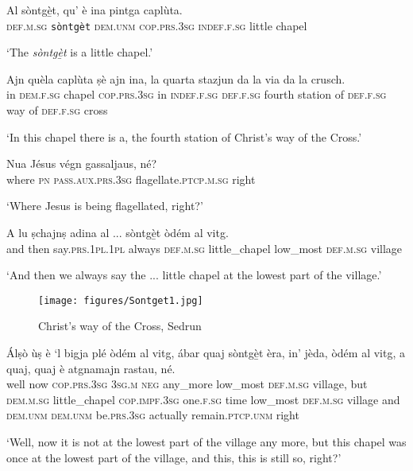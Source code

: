 \begin{linenumbers}
\gll Al sòntgè̱t, qu’ è ina pintga caplùta.\\
 \textsc{def.m.sg} \texttt{sòntgèt} \textsc{dem.unm} \textsc{cop.prs.3sg} \textsc{indef.f.sg} little chapel\\
\end{linenumbers}
\medskip
\glt `The \textit{sòntgè̱t} is a little chapel.'
\medskip

\begin{linenumbers}
\gll Ajn quèla caplùta ṣè ajn ina, la quarta stazjun da la via da la crusch.\\
in \textsc{dem.f.sg} chapel \textsc{cop.prs.3sg} in \textsc{indef.f.sg} \textsc{def.f.sg} fourth station of \textsc{def.f.sg} way of \textsc{def.f.sg} cross \\
\end{linenumbers}
\medskip
\glt `In this chapel there is a, the fourth station of Christ’s way of the Cross.'
\medskip

\begin{linenumbers}
\gll  Nua\footnotemark{} Jésus végn gassaljaus, né?  \\
where \textsc{pn} \textsc{pass.aux.prs.3sg} flagellate.\textsc{ptcp.m.sg} right \\
\end{linenumbers}
\medskip
\glt `Where Jesus is being flagellated, right?'
\medskip

\begin{linenumbers}
\gll A lu ṣchajnṣ adina al ... sòntgè̱t òdém al vitg.\\
and then say.\textsc{prs.1pl.1pl} always \textsc{def.m.sg} {} little\_chapel low\_most \textsc{def.m.sg} village\\
\end{linenumbers}
\medskip
\glt `And then we always say the ... little chapel at the lowest part of the village.'
\medskip

\begin{figure}[t]
	\texttt{[image: figures/Sontget1.jpg]}
	\caption{Christ's way of the Cross, Sedrun}
\end{figure}



\begin{linenumbers}
\gll  Álṣò ùṣ è `l bigja plé òdém al vitg, ábar quaj sòntgè̱t èra, in’ jèda, òdém al vitg, a quaj, quaj è atgnamajn rastau, né. \\
well now  \textsc{cop.prs.3sg} \textsc{3sg.m} \textsc{neg} any\_more low\_most \textsc{def.m.sg} village, but \textsc{dem.m.sg} little\_chapel \textsc{cop.impf.3sg} one.\textsc{f.sg} time low\_most \textsc{def.m.sg} village and \textsc{dem.unm} \textsc{dem.unm} be.\textsc{prs.3sg} actually remain.\textsc{ptcp.unm} right\\
\end{linenumbers}
\medskip
\glt `Well, now it is not at the lowest part of the village any more, but this chapel was once at the lowest part of the village, and this, this is still so, right?'
\medskip

